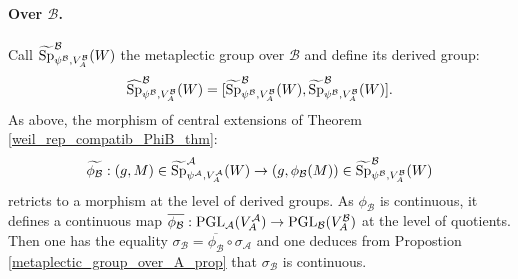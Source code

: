 \documentclass[11pt]{article}
\theoremstyle{plain}
\theoremstyle{definition}
\theoremstyle{plain}
\theoremstyle{definition}
\theoremstyle{plain}
\begin{document}
\paragraph{Over $\mathcal{B}$.} Call $\widetilde{\textup{Sp}}_{\psi^\mathcal{B},V_A^\mathcal{B}}^\mathcal{B}(W)$ the metaplectic group over $\mathcal{B}$ and define its derived group:
$$\widehat{\textup{Sp}}_{\psi^\mathcal{B},V_A^\mathcal{B}}^\mathcal{B}(W) =[\widetilde{\textup{Sp}}_{\psi^\mathcal{B},V_A^\mathcal{B}}^\mathcal{B}(W),\widetilde{\textup{Sp}}_{\psi^\mathcal{B},V_A^\mathcal{B}}^\mathcal{B}(W)].$$
As above, the morphism of central extensions of Theorem \ref{weil_rep_compatib_PhiB_thm}: 
$$\widetilde{\phi_\mathcal{B}} : (g,M) \in \widetilde{\textup{Sp}}_{\psi^\mathcal{A},V_A^\mathcal{A}}^\mathcal{A}(W) \to (g,\phi_\mathcal{B}(M)) \in \widetilde{\textup{Sp}}_{\psi^\mathcal{B},V_A^\mathcal{B}}^\mathcal{B}(W)$$
retricts to a morphism at the level of derived groups. As $\phi_\mathcal{B}$ is continuous, it defines a continuous map $\overline{\phi_\mathcal{B}} : \textup{PGL}_\mathcal{A}(V_A^\mathcal{A}) \to \textup{PGL}_\mathcal{B}(V_A^\mathcal{B})$ at the level of quotients. Then one has the equality $\sigma_\mathcal{B} = \overline{\phi_\mathcal{B}} \circ \sigma_\mathcal{A}$ and one deduces from Propostion \ref{metaplectic_group_over_A_prop} that $\sigma_\mathcal{B}$ is continuous.
\end{document}
